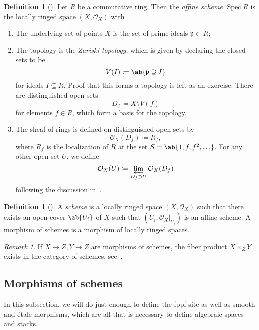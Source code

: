 \documentclass{amsart}
\theoremstyle{definition}
\newtheorem{defn}[thm]{Definition}
\theoremstyle{remark}
\newtheorem{rmk}[thm]{Remark}
\theoremstyle{plain}
\theoremstyle{definition}
\theoremstyle{remark}
\newcommand{\mc}[1]{\mathcal{#1}}
\newcommand{\mf}[1]{\mathfrak{#1}}
\newcommand{\1}{\mathbf{1}}
\newcommand{\2}{\mathbf{2}}
\newcommand{\3}{\mathbf{3}}
\DeclareMathOperator{\Spec}{Spec}
\begin{document}
\begin{defn}[{\cite[Definition 1.1.23]{schemesnotes}}]
    Let $R$ be a commutative ring. Then the \textit{affine scheme} $\Spec R$ is the locally ringed space $(X, \mc{O}_X)$ with
    \begin{enumerate}
        \item The underlying set of points $X$ is the set of prime ideals $\mf{p} \subset R$;
        \item The topology is the \textit{Zariski topology}, which is given by declaring the closed sets to be
            \[ V(I) \coloneqq \ab\{ \mf{p} \supseteq I \} \]
            for ideals $I \subseteq R$. Proof that this forms a topology is left as an exercise. There are distinguished open sets
            \[ D_f \coloneqq X \setminus V(f) \]
            for elements $f \in R$, which form a basis for the topology.
        \item The sheaf of rings is defined on distinguished open sets by
            \[ \mc{O}_X(D_f) \coloneqq R_f, \]
            where $R_f$ is the localization of $R$ at the set $S = \ab\{1,f,f^2,\ldots\}$. For any other open set $U$, we define
            \[ \mc{O}_X(U) \coloneqq \varprojlim_{D_f \supset U} \mc{O}_X(D_f) \]
            following the discussion in~\cite[Subsection 1.1.3]{schemesnotes}.
    \end{enumerate}
\end{defn}

\begin{defn}[{\cite[Definition 1.2.1]{schemesnotes}}]
    A \textit{scheme} is a locally ringed space $(X, \mc{O}_X)$ such that there exists an open cover $\ab\{U_i\}$ of $X$ such that $(U_i, \mc{O}_X|_{U_i})$ is an affine scheme. A morphism of schemes is a morphism of locally ringed spaces.
\end{defn}

\begin{rmk}
    If $X \to Z, Y \to Z$ are morphisms of schemes, the fiber product $X \times_Z Y$ exists in the category of schemes, see~\cite[\href{https://stacks.math.columbia.edu/tag/01JM}{Tag 01JM}]{stacks}.
\end{rmk}


\subsection{Morphisms of schemes}

In this subsection, we will do just enough to define the fppf site as well as smooth and \'etale morphisms, which are all that is necessary to define algebraic spaces and stacks.
\end{document}
